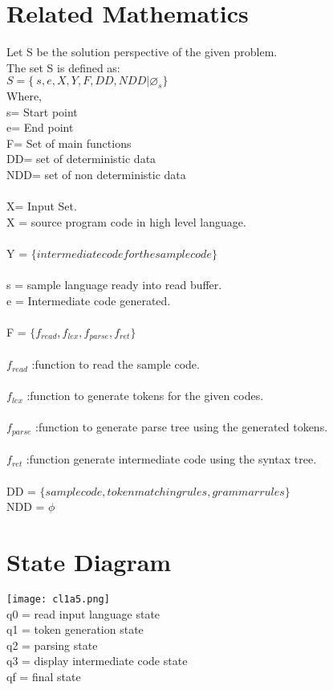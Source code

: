 \documentclass[10pt,a4paper]{article}
\begin{document}
\section{Related Mathematics}
Let S be the solution perspective of the given problem.
\\The set S is defined as:
\\$S=\lbrace\ s,e,X,Y,F,DD,NDD|\varnothing_{s}\rbrace$
\\Where,
\\s= Start point 
\\e= End point 
\\F= Set of main functions
\\DD= set of deterministic data
\\NDD= set of non deterministic data
\\\\X= Input Set.
\\X = source program code in high level language.
\\\\ Y = $\lbrace intermediate code for the sample code \rbrace$ 
\\\\ s = sample language ready into read buffer.
\\ e = Intermediate code generated.
\\\\ F = $\lbrace f_{read}, f_{lex}, f_{parse}, f_{ret} \rbrace$
\\\\$f_{read}$  :function to read the sample code.
\\\\ $f_{lex}$ :function to generate tokens for the given codes.
\\\\ $f_{parse}$ :function to generate parse tree using the generated tokens.
\\\\ $f_{ret}$ :function generate intermediate code using the syntax tree.
\\\\ DD = $\lbrace sample code, token matching rules, grammar rules \rbrace$
\\ NDD = $\phi$

\section{State Diagram}
\texttt{[image: cl1a5.png]}
\\q0 = read input language state
\\q1 = token generation state
\\q2 = parsing state
\\q3 = display intermediate code state
\\qf = final state
\end{document}
